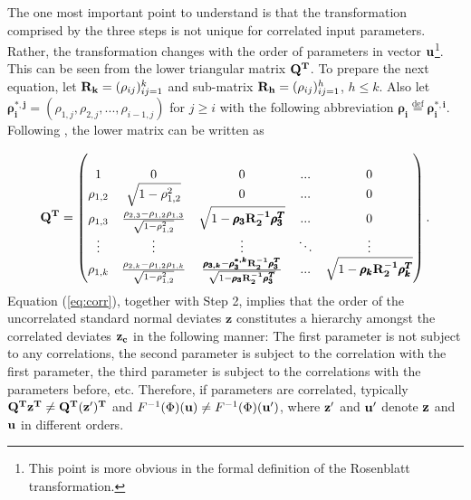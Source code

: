 \documentclass[a4paper,12pt]{article}
\newcommand*{\defeq}{\stackrel{\text{def}}{=}}
\begin{document}
\noindent
The one most important point to understand is that the transformation comprised by the three steps is not unique for correlated input parameters. Rather, the transformation changes with the order of parameters in vector $\bold{u}$\footnote{This point is more obvious in the formal definition of the Rosenblatt transformation.}. This can be seen from the lower triangular matrix $\bold{Q^T}$. To prepare the next equation, let $\bold{R_k} = (\rho_{ij})_{ij=1}^k$ and sub-matrix $\bold{R_h} = (\rho_{ij})_{ij=1}^h$, $h \leq k$. Also let $\pmb{\rho_i^{*,j}} = (\rho_{1,j}, \rho_{2,j}, ..., \rho_{i-1,j})$ for $j \geq i$ with the following abbreviation $\pmb{\rho_i}\defeq\pmb{\rho_i^{*,i}}$. Following \cite{madar2015direct}, the lower matrix can be written as

\begin{align} \label{eq:corr}
\bold{Q^T} =
\begin{pmatrix}
\\ 1 & 0 & 0 & ... & 0
\\\rho_{1,2} & \sqrt{1-\rho_{1,2}^2} & 0 & ... & 0
\\ \rho_{1,3} & \frac{\rho_{2,3}-\rho_{1,2}\rho_{1,3}}{\sqrt{1-\rho_{1,2}^2}} & \sqrt{1-\pmb{\rho_{3}}\bold{R^{-1}_2}\pmb{\rho_{3}^T}} & ... & 0
\\\vdots & \vdots & \vdots & 	\ddots & \vdots
\\ \rho_{1,k} &\frac{\rho_{2,k}-\rho_{1,2}\rho_{1,k}}{\sqrt{1-\rho_{1,2}^2}} & \frac{\pmb{\rho_{3,k}}-\pmb{\rho_{3}^{*,k}}\bold{R^{-1}_2}\pmb{\rho_{3}^T}}{\sqrt{1-\pmb{\rho_{3}}\bold{R^{-1}_2}\pmb{\rho_{3}^T}}}  &
... & \sqrt{1-\pmb{\rho_{k}}\bold{R^{-1}_2}\pmb{\rho_{k}^T}}
\end{pmatrix}.
\end{align}
Equation (\ref{eq:corr}), together with Step 2, implies that the order of the uncorrelated standard normal deviates $\pmb{z}$ constitutes a hierarchy amongst the correlated deviates $\bold{z_c}$ in the following manner: The first parameter is not subject to any correlations, the second parameter is subject to the correlation with the first parameter, the third parameter is subject to the correlations with the parameters before, etc. Therefore, if parameters are correlated, typically $\bold{Q^T z^T} \neq \bold{Q^T (z')^T}$ and $F^{-1}(\Phi)(\bold{u}) \neq F^{-1}(\Phi)(\bold{u'})$, where $\bold{z'}$ and $\bold{u'}$ denote $\bold{z}$ and $\bold{u}$ in different orders.
\end{document}
